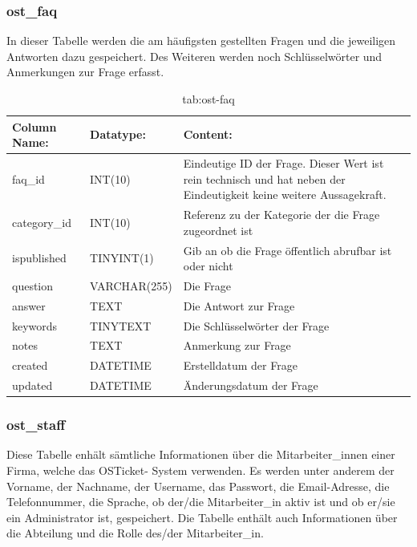 \subsubsection{ost\_faq}

In dieser Tabelle werden die am häufigsten gestellten Fragen und die jeweiligen Antworten dazu gespeichert. Des Weiteren werden noch Schlüsselwörter und Anmerkungen zur Frage erfasst.

\begin{table}[h]
	\begin{tabular}{|p{3.5cm}|p{4cm}|p{6.2cm}|}
		\hline
		\textbf{Column Name:} & \textbf{Datatype:} & \textbf{Content:}\\
		\hline
		faq\_id & INT(10) & Eindeutige ID der Frage. Dieser Wert ist rein technisch und hat  neben der Eindeutigkeit keine weitere 
		Aussagekraft.\\
		\hline
		category\_id & INT(10) & Referenz zu der Kategorie der die Frage zugeordnet ist  \\
		\hline
		ispublished & TINYINT(1) & Gib an ob die Frage öffentlich abrufbar ist oder nicht\\
		\hline
		question & VARCHAR(255) & Die Frage\\
		\hline
		answer & TEXT & Die Antwort zur Frage\\
		\hline
		keywords & TINYTEXT & Die Schlüsselwörter der Frage \\
		\hline
		notes & TEXT & Anmerkung zur Frage\\
		\hline
		created & DATETIME & Erstelldatum der Frage\\
		\hline
		updated & DATETIME & Änderungsdatum der Frage\\
		\hline
	\end{tabular}
	\caption{tab:ost-faq}
\end{table}
\label{tab:ost_faq}

\newpage

\subsubsection{ost\_staff}

Diese Tabelle enhält sämtliche Informationen über die  Mitarbeiter\_innen einer Firma, welche das OSTicket- System verwenden. Es werden unter anderem der Vorname, der Nachname, der Username, das Passwort, die Email-Adresse, die Telefonnummer, die Sprache, ob der/die Mitarbeiter\_in aktiv ist und ob er/sie ein Administrator ist, gespeichert.
Die Tabelle enthält auch Informationen über die Abteilung und die Rolle des/der Mitarbeiter\_in.


